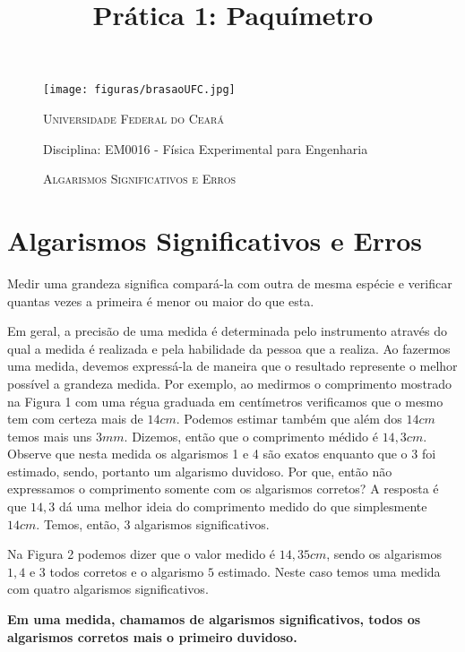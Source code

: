 \documentclass[10pt,a4paper,onecolumn,notitlepage]{scrartcl}
\author{}
\title{Prática 1: Paquímetro}
\begin{document}
\thispagestyle{myheadings}

\begin{figure}
\begin{minipage}{0.08\linewidth}
\texttt{[image: figuras/brasaoUFC.jpg]} 
\end{minipage}
\begin{minipage}{0.91\linewidth}
\textsc{Universidade Federal do Ceará}

Disciplina: EM0016 - Física Experimental para Engenharia
\end{minipage}

\begin{minipage}{\linewidth}
\centering
\textsc{Algarismos Significativos e Erros}
\\
\hrulefill %
\end{minipage}
\end{figure}

\section{Algarismos Significativos e Erros}
Medir uma grandeza significa compará-la com outra de mesma espécie e verificar quantas vezes a primeira é menor ou maior do que esta.

Em geral, a precisão de uma medida é determinada pelo instrumento através do qual a medida é realizada e pela habilidade da pessoa que a realiza. Ao fazermos uma medida, devemos expressá-la de maneira que o resultado represente o melhor possível a grandeza medida. Por exemplo, ao medirmos o comprimento mostrado na Figura 1 com uma régua graduada em centímetros verificamos que o mesmo tem com certeza mais de $14cm$. Podemos estimar também que além dos $14cm$ temos mais uns $3mm$. Dizemos, então que o comprimento médido é $14,3cm$. Observe que nesta medida os algarismos 1 e 4 são exatos enquanto que o 3 foi estimado, sendo, portanto um algarismo duvidoso. Por que, então não expressamos o comprimento somente com  os algarismos corretos? A resposta é que $14,3$ dá uma melhor ideia do comprimento medido do que simplesmente $14cm$. Temos, então, 3 algarismos significativos.

Na Figura 2 podemos dizer que o valor medido é $14,35cm$, sendo os algarismos $1,4$ e $3$ todos corretos e o algarismo $5$ estimado. Neste caso temos uma medida com quatro algarismos significativos.

\textbf{Em uma medida, chamamos de algarismos significativos, todos os algarismos corretos mais o primeiro duvidoso.}
\end{document}
